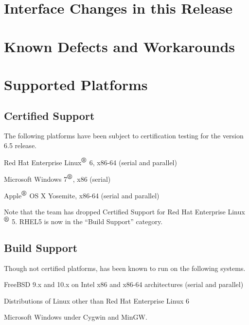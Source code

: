 \documentclass{article}
\begin{document}
\newpage
\section{Interface Changes in this Release}



\newpage
\section{Known Defects and Workarounds}



\newpage
\section{Supported Platforms}
\subsection*{Certified Support}
The following platforms have been subject to certification testing for the
\Xyce{} version 6.5 release.
\begin{XyceItemize}
  \item Red Hat Enterprise Linux${}^{\mbox{\textregistered}}$ 6, x86-64 (serial and parallel)
  \item Microsoft Windows 7${}^{\mbox{\textregistered}}$, x86 (serial)
  \item Apple${}^{\mbox{\textregistered}}$ OS X Yosemite, x86-64 (serial and parallel)
\end{XyceItemize}
Note that the \Xyce{} team has dropped Certified Support for Red Hat
Enterprise Linux${}^{\mbox{\textregistered}}$ 5. RHEL5 is now in the
``Build Support'' category.

\subsection*{Build Support}
Though not certified platforms, \Xyce{} has been known to run on the following
systems.
\begin{XyceItemize}
  \item FreeBSD 9.x and 10.x on Intel x86 and x86-64 architectures (serial and parallel)
  \item Distributions of Linux other than Red Hat Enterprise Linux 6
  \item Microsoft Windows under Cygwin and MinGW.
\end{XyceItemize}
\end{document}
